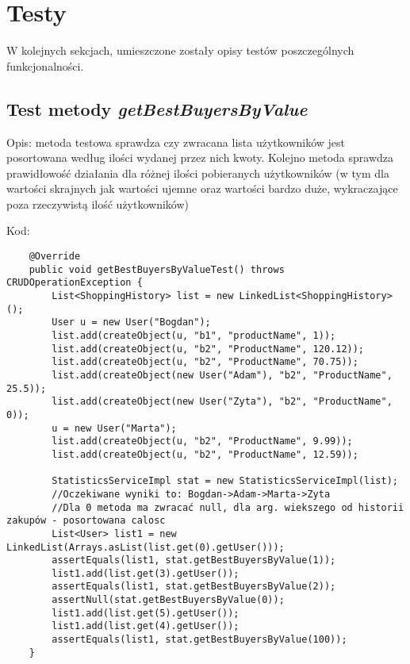 \documentclass[a4paper,11pt,notitlepage]{article}
\begin{document}
\section{Testy}

W kolejnych sekcjach, umieszczone zostały opisy testów poszczególnych funkcjonalności.

\subsection{Test metody \textit{getBestBuyersByValue}}

Opis: metoda testowa sprawdza czy zwracana lista użytkowników jest posortowana według ilości wydanej przez nich kwoty. Kolejno metoda sprawdza prawidłowość działania dla różnej ilości pobieranych użytkowników (w tym dla wartości skrajnych jak wartości ujemne oraz wartości bardzo duże, wykraczające poza rzeczywistą ilość użytkowników)

Kod:
\begin{footnotesize}\begin{verbatim}
    @Override
    public void getBestBuyersByValueTest() throws CRUDOperationException {
        List<ShoppingHistory> list = new LinkedList<ShoppingHistory>();
        User u = new User("Bogdan");
        list.add(createObject(u, "b1", "productName", 1));
        list.add(createObject(u, "b2", "ProductName", 120.12));
        list.add(createObject(u, "b2", "ProductName", 70.75));
        list.add(createObject(new User("Adam"), "b2", "ProductName", 25.5));
        list.add(createObject(new User("Zyta"), "b2", "ProductName", 0));
        u = new User("Marta");
        list.add(createObject(u, "b2", "ProductName", 9.99));
        list.add(createObject(u, "b2", "ProductName", 12.59));

        StatisticsServiceImpl stat = new StatisticsServiceImpl(list);
        //Oczekiwane wyniki to: Bogdan->Adam->Marta->Zyta
        //Dla 0 metoda ma zwracać null, dla arg. wiekszego od historii zakupów - posortowana calosc
        List<User> list1 = new LinkedList(Arrays.asList(list.get(0).getUser()));
        assertEquals(list1, stat.getBestBuyersByValue(1));
        list1.add(list.get(3).getUser());
        assertEquals(list1, stat.getBestBuyersByValue(2));
        assertNull(stat.getBestBuyersByValue(0));
        list1.add(list.get(5).getUser());
        list1.add(list.get(4).getUser());
        assertEquals(list1, stat.getBestBuyersByValue(100));
    }
\end{verbatim}\end{footnotesize}
\end{document}
